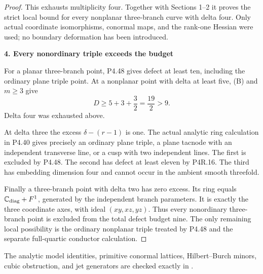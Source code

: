 \begin{proof}
This exhausts multiplicity four. Together with Sections 1--2 it proves the strict local bound for every nonplanar three-branch curve with delta four. Only actual coordinate isomorphisms, conormal maps, and the rank-one Hessian were used; no boundary deformation has been introduced.

\par\medskip\noindent\textbf{4. Every nonordinary triple exceeds the budget}\par\label{every-nonordinary-triple-exceeds-the-budget}

For a planar three-branch point, P4.48 gives defect at least ten, including the ordinary plane triple point. At a nonplanar point with delta at least five, (B) and \(m\ge3\) give \[
                  D\ge5+3+\frac32=\frac{19}{2}>9.
\] Delta four was exhausted above.

At delta three the excess \(\delta-(r-1)\) is one. The actual analytic ring calculation in P4.40 gives precisely an ordinary plane triple, a plane tacnode with an independent transverse line, or a cusp with two independent lines. The first is excluded by P4.48. The second has defect at least eleven by P4R.16. The third has embedding dimension four and cannot occur in the ambient smooth threefold.

Finally a three-branch point with delta two has zero excess. Its ring equals \(\mathbb C_{\rm diag}+F^1\), generated by the independent branch parameters. It is exactly the three coordinate axes, with ideal \((xy,xz,yz)\). Thus every nonordinary three-branch point is excluded from the total defect budget nine. The only remaining local possibility is the ordinary nonplanar triple treated by P4.48 and the separate full-quartic conductor calculation.

\end{proof}

The analytic model identities, primitive conormal lattices,
Hilbert--Burch minors, cubic obstruction, and jet generators are
checked exactly in .
